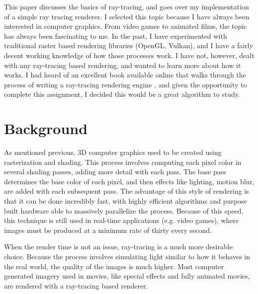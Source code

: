 \documentclass[10pt]{IEEEtran}
\begin{document}
This paper discusses the basics of ray-tracing, and goes over my implementation of a simple ray
tracing renderer. I selected this topic because I have always been interested in computer graphics.
From video games to animated films, the topic has always been fascinating to me. In the past, I have
experimented with traditional raster based rendering libraries (OpenGL, Vulkan), and I have a fairly
decent working knowledge of how those processes work. I have not, however, dealt with any
ray-tracing based rendering, and wanted to learn more about how it works. I had heard of an
excellent book available online that walks through the process of writing a ray-tracing rendering
engine \cite{Shirley2020RTW1}, and given the opportunity to complete this assignment, I decided this
would be a great algorithm to study.

\section*{Background}

As mentioned previous, 3D computer graphics used to be created using rasterization and shading. This
process involves computing each pixel color in several shading passes, adding more detail with each
pass. The base pass determines the base color of each pixel, and then effects like lighting, motion
blur, are added with each subsequent pass. The advantage of this style of rendering is that it can
be done incredibly fast, with highly efficient algorithms and purpose built hardware able to
massively parallelize the process. Because of this speed, this technique is still used in real-time
applications (e.g. video games), where images must be produced at a minimum rate of thirty every
second.

When the render time is not an issue, ray-tracing is a much more desirable choice. Because the
process involves simulating light similar to how it behaves in the real world, the quality of the
images is much higher. Most computer generated imagery used in movies, like special effects and
fully animated movies, are rendered with a ray-tracing based renderer.
\end{document}
